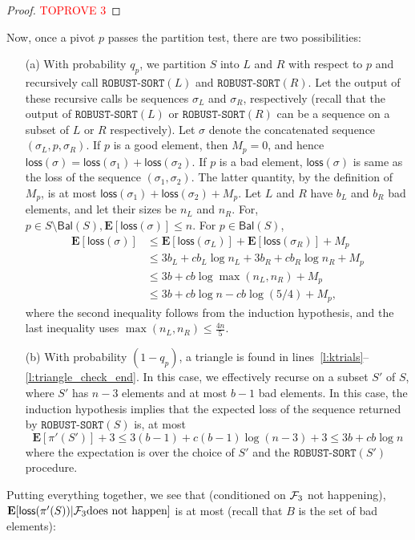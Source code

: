 \documentclass[11pt]{llncs}
\newcommand{\Bal}{{\mathsf{Bal}}}
\newcommand{\E}{\mathbf{E}}
\newcommand{\loss}{{\textsf{loss}}}
\newcommand{\RS}{{\texttt{ROBUST-SORT}}}
\begin{document}
\begin{proof}\textcolor{red}{TOPROVE 3}\end{proof}
 
Now, once a pivot $p$ passes the partition test, there are two possibilities: 
\begin{itemize}
\item[(a)] With probability $q_p$, we partition $S$ into $L$ and $R$ with respect to $p$ and recursively call $\RS(L)$ and $\RS(R)$. Let the output of these recursive calls be sequences $\sigma_L$ and $\sigma_R$, respectively (recall that the output of $\RS(L)$ or $\RS(R)$ can be a sequence on a subset of $L$ or $R$ respectively). Let $\sigma$ denote the concatenated sequence $(\sigma_L, p, \sigma_R)$.  If $p$ is a good element, then $M_p=0$, and hence $\loss(\sigma) = \loss(\sigma_1) + \loss(\sigma_2)$. If $p$ is a bad element, $\loss(\sigma)$ is same as the loss of the sequence $(\sigma_1, \sigma_2)$. The latter quantity, by the definition of $M_p$, is at most $\loss(\sigma_1) + \loss(\sigma_2) + M_p.$ Let $L$ and $R$ have $b_L$ and $b_R$ bad elements, and let their sizes be $n_L$ and $n_R.$ For, $p \in S \setminus \Bal(S), \E[\loss(\sigma)] \leq n$. For $p \in \Bal(S)$, 
    \begin{align*}
        \E[\loss(\sigma)] & \leq \E[\loss(\sigma_L)] + \E[\loss(\sigma_R)] + M_p \\
        & \leq 3b_L + cb_L \log n_L + 3b_R + cb_R \log n_R + M_p \\
        & \leq 3b + c b \log \max(n_L, n_R) + M_p  \\
        &\leq 3b + cb \log n - c b \log(5/4)  +M_p,
    \end{align*}
where the second inequality follows from the induction hypothesis, and the last inequality uses $\max(n_L, n_R) \leq \frac{4n}{5}$.

\item[(b)] With probability $(1-q_p)$, a triangle is found in lines~\ref{l:ktrials}--\ref{l:triangle_check_end}. In this case, we effectively recurse on a subset $S'$ of $S$, where $S'$ has $n-3$ elements and at most $b-1$ bad elements. In this case, the induction hypothesis implies that the expected loss of the sequence returned by $\RS(S)$ is, at most
$$ \E[\pi'(S')] +3 \leq 3(b-1) +  c(b-1) \log (n-3) + 3 \leq 3b + c b \log n$$ where the expectation is over the choice of $S'$ and the $\RS(S')$ procedure. 
\end{itemize}
  Putting everything together, we see that (conditioned on ${\cal F}_3$ not happening), $\E[\loss(\pi'(S)) | {\cal F}_3 \text{does not happen}]$ is at most (recall that $B$ is the set of bad elements):
\end{document}
